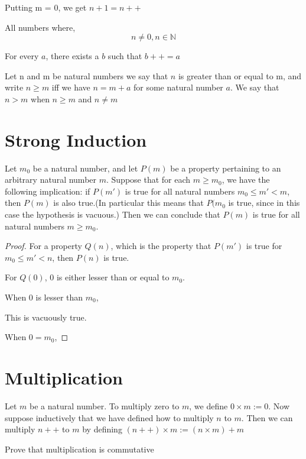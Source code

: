 \documentclass[11pt]{report}
\begin{document}
Putting m = 0, we get \(n+1 = n++\)
\begin{definition}
All numbers where,
\[
n \neq 0, n \in \mathbb{N}
\]
\end{definition}

\begin{lemma}
For every $a$, there exists a $b$ such that $b++ = a$
\end{lemma}

\begin{definition}[Order]
Let n and m be natural numbers we say that $n$ is greater than or equal to m, and write $n \geq m$ iff we have $n = m + a$ for some natural number $a$. We say that $n > m$ when $n \geq m$ and $n \neq m$
\end{definition}
\section{Strong Induction}
\label{sec:orgd7327b7}
\begin{theorem}
Let \(m_0\) be a natural number, and let \(P(m)\) be a property pertaining to an arbitrary natural number \(m\). Suppose that for each \(m \geq m_0\), we have the following implication: if \(P(m')\) is true for all natural numbers \(m_0 \leq m' < m\), then \(P(m)\) is also true.(In particular this means that \(P(m_0\) is true, since in this case the hypothesis is vacuous.) Then we can conclude that \(P(m)\) is true for all natural numbers \(m \geq m_0\).
\end{theorem}
\begin{proof}
For a property \(Q(n)\), which is the property that \(P(m')\) is true for \(m_0 \leq m' < n\), then \(P(n)\) is true.

For \(Q(0)\),
\(0\) is either lesser than or equal to \(m_0\).

When \(0\) is lesser than \(m_0\),

This is vacuously true.

When \(0 = m_0\),
\end{proof}
\section{Multiplication}
\label{sec:org5facaae}
\begin{definition}
Let \(m\) be a natural number. To multiply zero to \(m\), we define \(0 \times m := 0\). Now suppose inductively that we have defined how to multiply \(n\) to \(m\). Then we can multiply \(n++\) to \(m\) by defining \((n++) \times m := (n \times m) + m\)
\end{definition}
\begin{lemma}
Prove that multiplication is commutative
\end{lemma}
\end{document}
